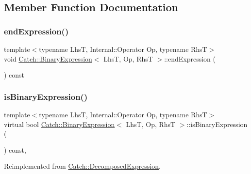 \subsection{Member Function Documentation}
\mbox{\label{class_catch_1_1_binary_expression_aa1dba7f316f70902859b8eab27692dfb}} 
\subsubsection{\texorpdfstring{end\+Expression()}{endExpression()}}
{\footnotesize\ttfamily template$<$typename LhsT, Internal\+::\+Operator Op, typename RhsT$>$ \\
void \hyperlink{class_catch_1_1_binary_expression}{Catch\+::\+Binary\+Expression}$<$ LhsT, Op, RhsT $>$\+::end\+Expression (\begin{DoxyParamCaption}{ }\end{DoxyParamCaption}) const\hspace{0.3cm}{\ttfamily [inline]}}

\mbox{\label{class_catch_1_1_binary_expression_a4c617c0b6a73a9cafbbf900909c7c258}} 
\subsubsection{\texorpdfstring{is\+Binary\+Expression()}{isBinaryExpression()}}
{\footnotesize\ttfamily template$<$typename LhsT, Internal\+::\+Operator Op, typename RhsT$>$ \\
virtual bool \hyperlink{class_catch_1_1_binary_expression}{Catch\+::\+Binary\+Expression}$<$ LhsT, Op, RhsT $>$\+::is\+Binary\+Expression (\begin{DoxyParamCaption}{ }\end{DoxyParamCaption}) const\hspace{0.3cm}{\ttfamily [inline]}, {\ttfamily [virtual]}}



Reimplemented from \hyperlink{struct_catch_1_1_decomposed_expression_a1c458ece47b71f093290dbdf9bb31fdb}{Catch\+::\+Decomposed\+Expression}.

